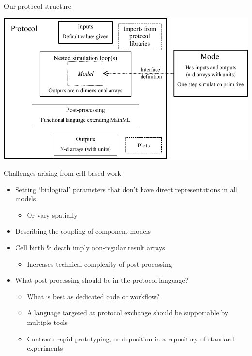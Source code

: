 \documentclass[t,xcolor={usenames,dvipsnames}]{beamer}
\newcommand{\subitem}[1]{\begin{itemize}[<.->]\item #1 \end{itemize}}
\begin{document}
\begin{frame}{Our protocol structure}
\begin{center}
\includegraphics[width=\textwidth]{protocol_language}
\end{center}
\end{frame}


\begin{frame}{Challenges arising from cell-based work}
\begin{itemize}
\item Setting `biological' parameters that don't have direct representations in all models
  \subitem{Or vary spatially}
\item Describing the coupling of component models
\item Cell birth \& death imply non-regular result arrays
  \subitem{Increases technical complexity of post-processing}
\item What post-processing should be in the protocol language?
  \begin{itemize}[<.->]
  \item What is best as dedicated code or workflow?
  \item A language targeted at protocol exchange should be supportable by multiple tools
  \item Contrast: rapid prototyping, or deposition in a repository of standard experiments
  \end{itemize}
\end{itemize}
\end{frame}
\end{document}
